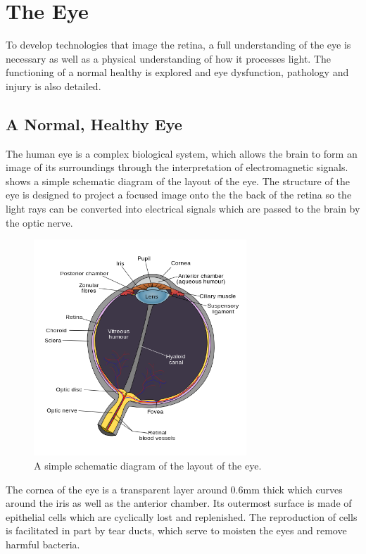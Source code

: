 
\chapter{The Eye}

\label{anatomy}

To develop technologies that image the retina, a full understanding
of the eye is necessary as well as a physical understanding of how it
processes light. The functioning of a normal healthy is explored and eye
dysfunction, pathology and injury is also detailed.

\section{A Normal, Healthy Eye}

The human eye is a complex biological system, which allows the brain to
form an image of its surroundings through the interpretation of
electromagnetic signals.  shows a simple schematic
diagram of the layout of the eye. The structure of the eye is designed to
project a focused image onto the the back of the retina so the light rays
can be converted into electrical signals which are passed to the brain by
the optic nerve.

\begin{figure}[H]
\centering
  \includegraphics[width=8cm]{figures/schematic_diagram_of_the_human_eye}
\caption{A simple schematic diagram of the layout of the eye.\cite{wikiRhcastilhos}}
\label{fig:eye_simple}
\end{figure}

The cornea of the eye is a transparent layer around 0.6mm thick
which curves around the iris as well as the anterior
chamber.\cite{yaylali1997corneal,thoft1983x,patel1994refractive}
Its outermost surface is made of epithelial cells which are cyclically lost
and replenished.\cite{jester1999cellular,hassell2010molecular} The
reproduction of cells is facilitated in part by tear ducts, which serve
to moisten the eyes and remove harmful bacteria.\cite{holly1977tear}

